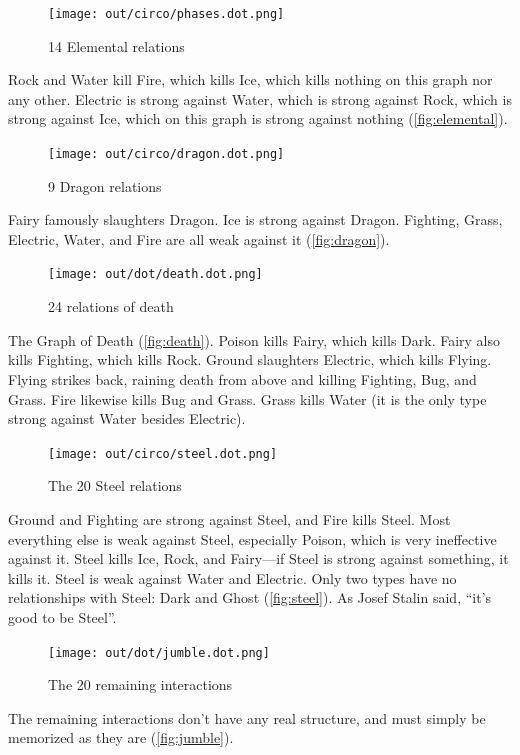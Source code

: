 \begin{figure}[ht]
\centering
    \texttt{[image: out/circo/phases.dot.png]}
    \caption{14 Elemental relations}
    \label{fig:elemental}
\end{figure}
\noindent{}Rock and Water kill Fire, which kills Ice, which kills nothing on this graph nor any other.
Electric is strong against Water, which is strong against Rock, which is strong against Ice,
 which on this graph is strong against nothing (\autoref{fig:elemental}).
\clearpage

\begin{figure}[t!]
\centering
\texttt{[image: out/circo/dragon.dot.png]}
\caption{9 Dragon relations}
\label{fig:dragon}
\end{figure}
\noindent{}Fairy famously slaughters Dragon.
Ice is strong against Dragon.
Fighting, Grass, Electric, Water, and Fire are all weak against it (\autoref{fig:dragon}).
\vspace{.5in}

\begin{figure}[h!]
\centering
\texttt{[image: out/dot/death.dot.png]}
\caption{24 relations of death}
\label{fig:death}
\end{figure}
\noindent{}The Graph of Death (\autoref{fig:death}).
Poison kills Fairy, which kills Dark.
Fairy also kills Fighting, which kills Rock.
Ground slaughters Electric, which kills Flying.
Flying strikes back, raining death from above and killing Fighting, Bug, and Grass.
Fire likewise kills Bug and Grass.
Grass kills Water (it is the only type strong against Water besides Electric).
\clearpage

\begin{figure}[h!]
\centering
\texttt{[image: out/circo/steel.dot.png]}
\caption{The 20 Steel relations}
\label{fig:steel}
\end{figure}
\noindent{}Ground and Fighting are strong against Steel, and Fire kills Steel.
Most everything else is weak against Steel, especially
 Poison, which is very ineffective against it.
Steel kills Ice, Rock, and Fairy---if Steel is strong against something, it kills it.
Steel is weak against Water and Electric.
Only two types have no relationships with Steel: Dark and Ghost (\autoref{fig:steel}).
As Josef Stalin said, ``it's good to be Steel''.

\begin{figure}[ht]
\centering
\texttt{[image: out/dot/jumble.dot.png]}
\caption{The 20 remaining interactions}
\label{fig:jumble}
\end{figure}
The remaining interactions don't have any real structure, and must simply be
memorized as they are (\autoref{fig:jumble}).

